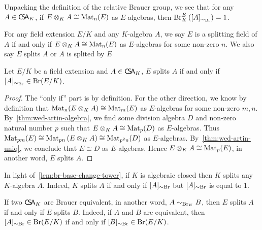  \begin{remark}
   Unpacking the definition of the relative Brauer group, we see that for any $A \in \operatorname{\mathsf{C}\!\mathsf{S}\!\mathsf{A}}_{K}$, if $E\otimes_{K}A\cong\operatorname{Mat}_{n}(E)$ as $E$-algebras, then $\operatorname{Br}^{E}_{K}\left([A]_{\sim_{\operatorname{Br}}}\right)=1$.
 \end{remark}

 \begin{definition}
   For any field extension $E/K$ and any $K$-algebra $A$, we say $E$ is a splitting field of $A$ if and only if $E\otimes_{K}A \cong \operatorname{Mat}_{n}(E)$ as $E$-algebras for some non-zero $n$. We also say $E$ splits $A$ or $A$ is splited by $E$
   \leanok
 \end{definition}

  \begin{theorem}
   \label{thm:split-iff-mem-relative}
   Let $E/K$ be a field extension and $A\in\operatorname{\mathsf{C}\!\mathsf{S}\!\mathsf{A}}_{K}$, $E$ splits $A$ if and only if $[A]_{\sim_{\operatorname{Br}}}\in\operatorname{Br}(E/K)$.
   \leanok
 \end{theorem}

 \begin{proof}
   The ``only if'' part is by definition. For the other direction, we know by definition that $\operatorname{Mat}_{n}(E\otimes_{K}A)\cong\operatorname{Mat}_{m}(E)$ as $E$-algebras for some non-zero $m, n$. By~\cref{thm:wed-artin-algebra}, we find some division algebra $D$ and non-zero natural number $p$ such that $E\otimes_{K}A\cong \operatorname{Mat}_{p}(D)$ as $E$-algebras. Thus $\operatorname{Mat}_{pm}(E)\cong\operatorname{Mat}_{pn}\left(E\otimes_{K}A\right)\cong\operatorname{Mat}_{p^{2}n}(D)$ as $E$-algebras. By~\cref{thm:wed-artin-uniq}, we conclude that $E\cong D$ as $E$-algebras. Hence $E\otimes_{K}A\cong \operatorname{Mat}_{p}(E)$, in another word, $E$ splits $A$.
 \end{proof}

 \begin{remark}
   In light of~\cref{lem:br-base-change-tower}, if $K$ is algebraic closed then $K$ splits any $K$-algebra $A$. Indeed, $K$ splits $A$ if and only if $[A]_{\sim\operatorname{Br}}$ but $[A]_{\sim\operatorname{Br}}$ is equal to $1$.
 \end{remark}

 \begin{remark}
   If two $\operatorname{\mathsf{C}\!\mathsf{S}\!\mathsf{A}}_{K}$ are Brauer equivalent, in another word, $A \sim_{\operatorname{Br}_{K}} B$, then $E$ splits $A$ if and only if $E$ splits $B$. Indeed, if $A$ and $B$ are equivalent, then $[A]_{\sim\operatorname{Br}} \in \operatorname{Br}(E/K)$ if and only if $[B]_{\sim\operatorname{Br}}\in\operatorname{Br}(E/K)$.
 \end{remark}


